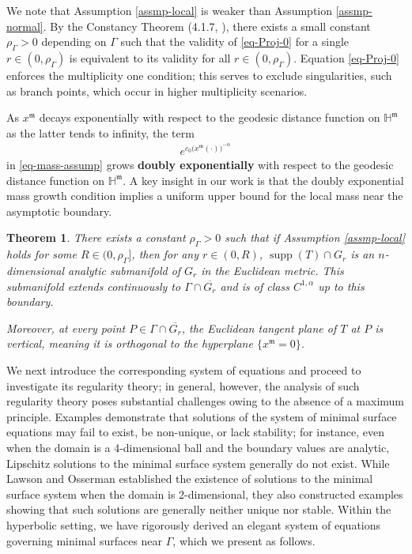 \documentclass[11pt,reqno]{amsart}
\newcommand{\fm}{\mathfrak{m}}
\newtheorem{theorem}{Theorem}[section]
\theoremstyle{definition}
\numberwithin{equation}{section}
\begin{document}
We note that Assumption \ref{assmp-local} is weaker than Assumption \ref{assmp-normal}. By the Constancy Theorem (4.1.7, \cite{Federer}), there exists a small constant $\rho_\Gamma>0$ depending on $\Gamma$ such that the validity of \eqref{eq-Proj-0} for a single $r\in(0,\rho_\Gamma)$ is equivalent to its validity for all $r\in(0,\rho_\Gamma)$. Equation \eqref{eq-Proj-0} enforces the multiplicity one condition; this serves to exclude singularities, such as branch points, which occur in higher multiplicity scenarios.

As $x^\fm$ decays exponentially with respect to the geodesic distance function on $\mathbb{H}^\fm$ as the latter tends to infinity, the term
\begin{align}
    e^{c_0 \bigl(x^\fm(\cdot)\bigr)^{-\alpha}}
\end{align}
in \eqref{eq-mass-assump} grows \textbf{doubly exponentially} with respect to the geodesic distance function on $\mathbb{H}^\fm$. A key insight in our work is that the doubly exponential mass growth condition implies a uniform upper bound for the local mass near the asymptotic boundary.

\begin{theorem}\label{thm-local-C1a}
There exists a constant $\rho_\Gamma > 0$ such that if Assumption \ref{assmp-local} holds for some $R \in (0, \rho_\Gamma]$, then  for any $r \in (0, R)$, $\operatorname{supp} (T) \cap G_r$ is an $n$-dimensional analytic submanifold of $G_r$ in the Euclidean metric. This submanifold extends continuously to $\Gamma \cap \overline{G_r}$ and is of class $C^{1,\alpha}$ up to this boundary.

Moreover, at every point $P \in \Gamma \cap \overline{G_r}$, the Euclidean tangent plane of $T$ at $P$ is vertical, meaning it is orthogonal to the hyperplane $\{x^\fm = 0\}$.
\end{theorem}

We next introduce the corresponding system of equations and proceed to investigate its regularity theory; in general, however, the analysis of such regularity theory poses substantial challenges owing to the absence of a maximum principle.
Examples demonstrate that solutions of the system of minimal surface equations may fail to exist, be non-unique, or lack stability; for instance, even when the domain is a 4-dimensional ball and the boundary values are analytic, Lipschitz solutions to the minimal surface system generally do not exist. While Lawson and Osserman \cite{LO} established the existence of solutions to the minimal surface system when the domain is 2-dimensional, they also constructed examples showing that such solutions are generally neither unique nor stable.
Within the hyperbolic setting, we have rigorously derived an elegant system of equations governing minimal surfaces near $\Gamma$, which we present as follows.
\end{document}
